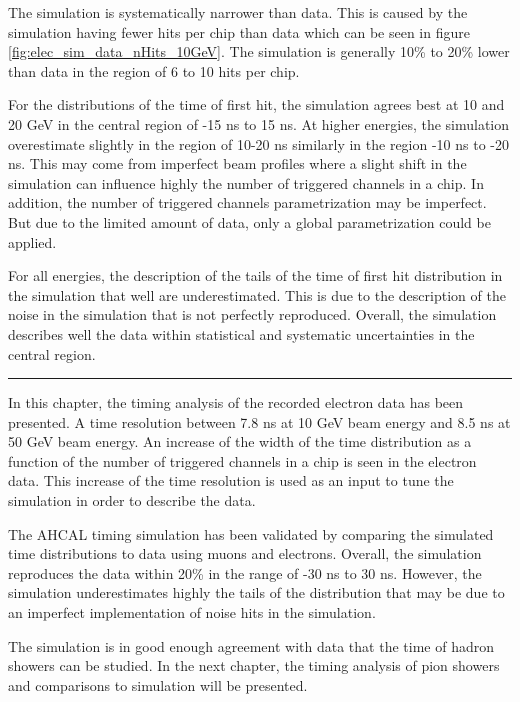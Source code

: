 The simulation is systematically narrower than data. This is caused by the simulation having fewer hits per chip than data which can be seen in figure \ref{fig:elec_sim_data_nHits_10GeV}. The simulation is generally 10\% to 20\% lower than data in the region of 6 to 10 hits per chip.

For the distributions of the time of first hit, the simulation agrees best at 10 and 20 GeV in the central region of -15 ns to 15 ns. At higher energies, the simulation overestimate slightly in the region of 10-20 ns similarly in the region -10 ns to -20 ns. This may come from imperfect beam profiles where a slight shift in the simulation can influence highly the number of triggered channels in a chip. In addition, the number of triggered channels parametrization may be imperfect. But due to the limited amount of data, only a global parametrization could be applied.

For all energies, the description of the tails of the time of first hit distribution in the simulation that well are underestimated. This is due to the description of the noise in the simulation that is not perfectly reproduced. Overall, the simulation describes well the data within statistical and systematic uncertainties in the central region.

\begin{center}
	\rule{0.5\textwidth}{.4pt}
\end{center}

In this chapter, the timing analysis of the recorded electron data has been presented. A time resolution between 7.8 ns at 10 GeV beam energy and 8.5 ns at 50 GeV beam energy. An increase of the width of the time distribution as a function of the number of triggered channels in a chip is seen in the electron data. This increase of the time resolution is used as an input to tune the simulation in order to describe the data.

The AHCAL timing simulation has been validated by comparing the simulated time distributions to data using muons and electrons. Overall, the simulation reproduces the data within 20\% in the range of -30 ns to 30 ns. However, the simulation underestimates highly the tails of the distribution that may be due to an imperfect implementation of noise hits in the simulation.

The simulation is in good enough agreement with data that the time of hadron showers can be studied. In the next chapter, the timing analysis of pion showers and comparisons to simulation will be presented.

